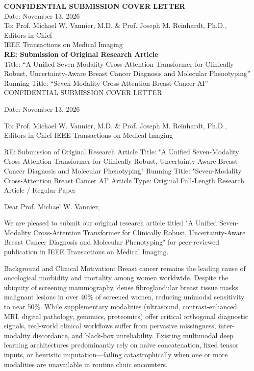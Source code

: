 \documentclass[11pt]{article}
\begin{document}
\noindent\textbf{CONFIDENTIAL SUBMISSION COVER LETTER}\\
\noindent Date: November 13, 2026\\
\noindent To: Prof. Michael W. Vannier, M.D. & Prof. Joseph M. Reinhardt, Ph.D., Editors-in-Chief\\
\noindent IEEE Transactions on Medical Imaging\\
\vspace{0.5cm}
\noindent\textbf{RE: Submission of Original Research Article}\\
\noindent Title: ``A Unified Seven-Modality Cross-Attention Transformer for Clinically Robust, Uncertainty-Aware Breast Cancer Diagnosis and Molecular Phenotyping''\\
\noindent Running Title: ``Seven-Modality Cross-Attention Breast Cancer AI''\\
\vspace{0.5cm}
CONFIDENTIAL SUBMISSION COVER LETTER

Date: November 13, 2026

To:
Prof. Michael W. Vannier, M.D. \& Prof. Joseph M. Reinhardt, Ph.D., Editors-in-Chief
IEEE Transactions on Medical Imaging

RE: Submission of Original Research Article
Title: "A Unified Seven-Modality Cross-Attention Transformer for Clinically Robust, Uncertainty-Aware Breast Cancer Diagnosis and Molecular Phenotyping"
Running Title: "Seven-Modality Cross-Attention Breast Cancer AI"
Article Type: Original Full-Length Research Article / Regular Paper

Dear Prof. Michael W. Vannier,

We are pleased to submit our original research article titled "A Unified Seven-Modality Cross-Attention Transformer for Clinically Robust, Uncertainty-Aware Breast Cancer Diagnosis and Molecular Phenotyping" for peer-reviewed publication in IEEE Transactions on Medical Imaging.

Background and Clinical Motivation:
Breast cancer remains the leading cause of oncological morbidity and mortality among women worldwide. Despite the ubiquity of screening mammography, dense fibroglandular breast tissue masks malignant lesions in over 40\% of screened women, reducing unimodal sensitivity to near 50\%. While supplementary modalities (ultrasound, contrast-enhanced MRI, digital pathology, genomics, proteomics) offer critical orthogonal diagnostic signals, real-world clinical workflows suffer from pervasive missingness, inter-modality discordance, and black-box unreliability. Existing multimodal deep learning architectures predominantly rely on naive concatenation, fixed tensor inputs, or heuristic imputation—failing catastrophically when one or more modalities are unavailable in routine clinic encounters.
\end{document}
